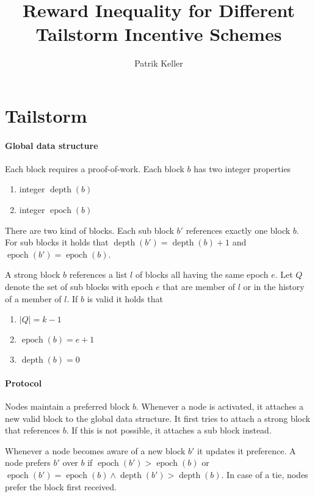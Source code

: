 \documentclass{article}
\title{Reward Inequality for Different Tailstorm Incentive Schemes}
\author{Patrik Keller}
\begin{document}
\maketitle

\section{Tailstorm}

\paragraph{Global data structure}

Each block requires a proof-of-work. Each block $b$ has two integer properties 
\begin{enumerate}
\item integer $\operatorname{depth}(b)$
\item integer $\operatorname{epoch}(b)$
\end{enumerate}

There are two kind of blocks. Each sub block $b'$ references exactly one block $b$. For sub blocks it holds that
$\operatorname{depth}(b') = \operatorname{depth}(b) + 1$ and $\operatorname{epoch}(b') = \operatorname{epoch}(b)$.

A strong block $b$ references a list $l$ of blocks all having the same epoch $e$. Let $Q$ denote the set of sub blocks with epoch $e$ that are member of $l$ or in the history of a member of $l$. If $b$ is valid it holds that
\begin{enumerate}
  \item $|Q| = k - 1$
  \item $\operatorname{epoch}(b) = e + 1$
  \item $\operatorname{depth}(b) = 0$
\end{enumerate}

\paragraph{Protocol}

Nodes maintain a preferred block $b$. Whenever a node is activated, it attaches a new valid block to the global data structure. It first tries to attach a strong block that references $b$. If this is not possible, it attaches a sub block instead.

Whenever a node becomes aware of a new block $b'$ it updates it preference. A node prefers $b'$ over $b$ if $\operatorname{epoch}(b') > \operatorname{epoch}(b)$ or $\operatorname{epoch}(b') = \operatorname{epoch}(b) \wedge \operatorname{depth}(b') > \operatorname{depth}(b)$. In case of a tie, nodes prefer the block first received.
\end{document}

